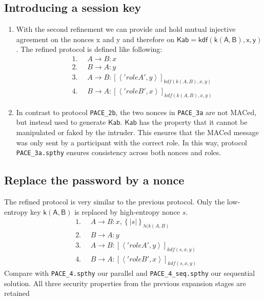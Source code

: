 \documentclass[a4paper,11pt]{scrartcl}
\newcommand{\tuple}[1]{\left\langle #1\right\rangle}
\begin{document}
\subsection{Introducing a session key}
\begin{enumerate}[label=\alph*)]
	\item With the second refinement we can provide and hold mutual injective agreement on the nonces x and y and therefore on $\mathsf{Kab = kdf(k(A,B),x,y)}$. The refined protocol is defined like following:
	\begin{align*}
	&\text{1. }\quad A \rightarrow B: x\\
	&\text{2. }\quad B \rightarrow A: y\\
	&\text{3. }\quad A \rightarrow B: [\tuple{'roleA',  y}]_{kdf(k(A,  B), x, y)}\\
	&\text{4. }\quad B \rightarrow A: [\tuple{'roleB',  x}]_{kdf(k(A,  B), x, y)}
	\end{align*}
	\item In contrast to protocol \texttt{PACE\_2b}, the two nonces in \texttt{PACE\_3a} are not MACed, but instead used to generate $\mathsf{Kab}$.  $\mathsf{Kab}$ has the property that it cannot be manipulated or faked by the intruder. This ensures that the MACed message was only sent by a participant with the correct role. In this way,  protocol 	\texttt{PACE\_3a.spthy} ensures consistency across both nonces and roles.
\end{enumerate}
\subsection{Replace the password by a nonce}
The refined protocol is very similar to the previous protocol. Only the low-entropy key $\mathsf{k(A,B)}$ is replaced by high-entropy nonce $s$.
	\begin{align*}
	&\text{1. }\quad A \rightarrow B: x, \left\lbrace| s | \right\rbrace_{h(k(A,B)}\\
	&\text{2. }\quad B \rightarrow A: y\\
	&\text{3. }\quad A \rightarrow B: [\tuple{'roleA',  y}]_{kdf(s, x, y)}\\
	&\text{4. }\quad B \rightarrow A: [\tuple{'roleB',  x}]_{kdf(s, x, y)}
	\end{align*}
	Compare with \texttt{PACE\_4.spthy} our parallel and \texttt{PACE\_4\_seq.spthy} our sequential solution.  All three security properties from the previous expansion stages are retained
\end{document}
